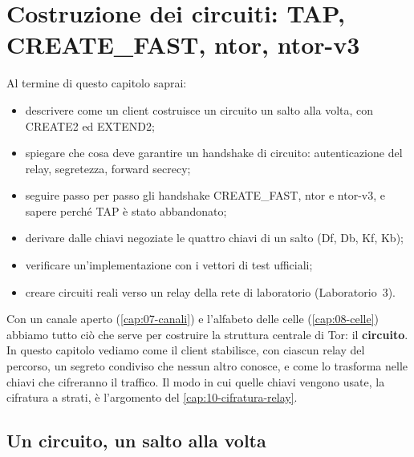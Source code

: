 \chapter{Costruzione dei circuiti: TAP, CREATE\_FAST, ntor, ntor-v3}\label{cap:09-circuiti}

\begin{obiettivi}
Al termine di questo capitolo saprai:
\begin{itemize}[nosep]
  \item descrivere come un client costruisce un circuito un salto alla volta, con CREATE2 ed EXTEND2;
  \item spiegare che cosa deve garantire un handshake di circuito: autenticazione del relay, segretezza, forward secrecy;
  \item seguire passo per passo gli handshake CREATE\_FAST, ntor e ntor-v3, e sapere perché TAP è stato abbandonato;
  \item derivare dalle chiavi negoziate le quattro chiavi di un salto (Df, Db, Kf, Kb);
  \item verificare un'implementazione con i vettori di test ufficiali;
  \item creare circuiti reali verso un relay della rete di laboratorio (Laboratorio~3).
\end{itemize}
\end{obiettivi}

Con un canale aperto (\cref{cap:07-canali}) e l'alfabeto delle celle (\cref{cap:08-celle}) abbiamo tutto ciò che serve per costruire la struttura centrale di Tor: il \textbf{circuito}. In questo capitolo vediamo come il client stabilisce, con ciascun relay del percorso, un segreto condiviso che nessun altro conosce, e come lo trasforma nelle chiavi che cifreranno il traffico. Il modo in cui quelle chiavi vengono usate, la cifratura a strati, è l'argomento del \cref{cap:10-cifratura-relay}.

\section{Un circuito, un salto alla volta}\label{sec:circ-telescopio}

